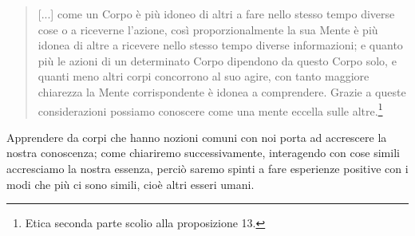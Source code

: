 \begin{quotation}
	\small [...] come un Corpo è più idoneo di altri a fare nello stesso tempo diverse cose o a riceverne l’azione, così proporzionalmente la sua Mente è più idonea di altre a ricevere nello stesso tempo diverse informazioni; e quanto più le azioni di un determinato Corpo dipendono da questo Corpo
	solo, e quanti meno altri corpi concorrono al suo agire, con tanto maggiore chiarezza la
	Mente corrispondente è idonea a comprendere. Grazie a queste considerazioni possiamo
	conoscere come una mente eccella sulle altre.\footnote{Etica seconda parte scolio alla proposizione 13.}
\end{quotation}

Apprendere da corpi che hanno nozioni comuni con noi porta ad accrescere la nostra conoscenza; come chiariremo successivamente, interagendo con cose simili accresciamo la nostra essenza, perciò saremo spinti a fare esperienze positive con i modi che più ci sono simili, cioè altri esseri umani.

